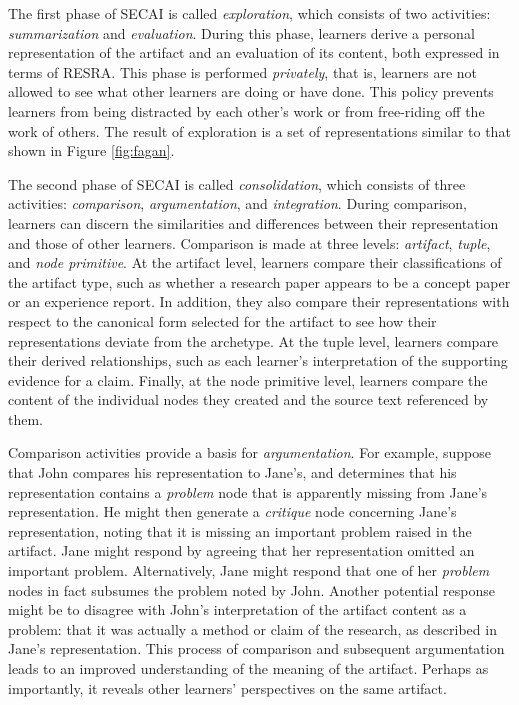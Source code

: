 \begin{quotation}
\end{quotation}

The first phase of SECAI is called {\it exploration}, which consists of two
activities: {\it summarization\/} and {\it evaluation\/}. During this
phase, learners derive a personal representation of the artifact and an
evaluation of its content, both expressed in terms of RESRA. This phase is
performed {\it privately}, that is, learners are not allowed to see what
other learners are doing or have done.  This policy prevents learners from
being distracted by each other's work or from free-riding off the work of
others.  The result of exploration is a set of representations similar to
that shown in Figure \ref{fig:fagan}.

The second phase of SECAI is called {\it consolidation}, which consists of
three activities: {\it comparison\/}, {\it argumentation\/}, and {\it
integration\/}.  During comparison, learners can discern the similarities
and differences between their representation and those of other learners.
Comparison is made at three levels: {\it artifact\/}, {\it tuple\/}, and
{\it node primitive\/}.  At the artifact level, learners compare their
classifications of the artifact type, such as whether a research paper
appears to be a concept paper or an experience report. In addition, they
also compare their representations with respect to the canonical form
selected for the artifact to see how their representations deviate from the
archetype. At the tuple level, learners compare their derived
relationships, such as each learner's interpretation of the supporting
evidence for a claim. Finally, at the node primitive level, learners
compare the content of the individual nodes they created and the source
text referenced by them.

Comparison activities provide a basis for {\it argumentation\/}. For
example, suppose that John compares his representation to Jane's, and
determines that his representation contains a {\em problem} node that is
apparently missing from Jane's representation.  He might then generate a
{\em critique} node concerning Jane's representation, noting that it is
missing an important problem raised in the artifact.  Jane might respond by
agreeing that her representation omitted an important problem.
Alternatively, Jane might respond that one of her {\em problem} nodes in
fact subsumes the problem noted by John.  Another potential response might
be to disagree with John's interpretation of the artifact content as a
problem: that it was actually a method or claim of the research, as
described in Jane's representation. This process of comparison and
subsequent argumentation leads to an improved understanding of the meaning
of the artifact. Perhaps as importantly, it reveals other learners'
perspectives on the same artifact.

